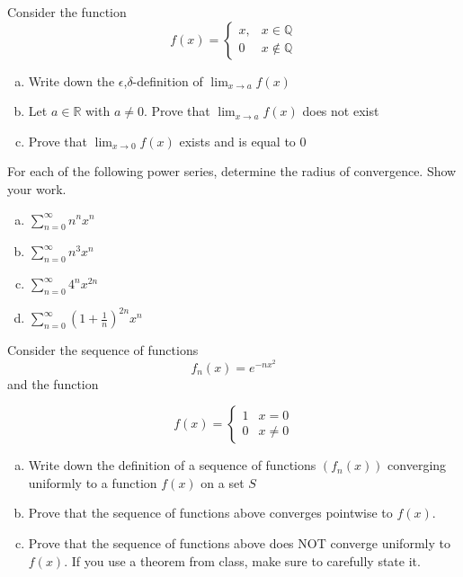 \documentclass[11pt]{exam}
\theoremstyle{definition}
\begin{document}
\begin{questions}
\newpage
\question[10]\mbox{}

Consider the function
$$f(x) = \left\lbrace\begin{array}{cc}x, & x\in \mathbb{Q}\\0 & x\notin\mathbb{Q}\end{array}\right.$$

\begin{enumerate}[(a)]
\item Write down the $\epsilon$,$\delta$-definition of $\lim_{x\rightarrow a} f(x)$
\vspace{1in}
\item Let $a\in\mathbb{R}$ with $a\neq 0$.  Prove that $\lim_{x\rightarrow a}f(x)$ does not exist
\vspace{3in}
\item Prove that $\lim_{x\rightarrow 0} f(x)$ exists and is equal to $0$
\end{enumerate}

\newpage
\question[10]\mbox{}

For each of the following power series, determine the radius of convergence.  Show your work.

\begin{enumerate}[(a)]
\item $\sum_{n=0}^\infty n^nx^n$
\vspace{2in}
\item $\sum_{n=0}^\infty n^3x^n$
\vspace{2in}
\item $\sum_{n=0}^\infty 4^nx^{2n}$
\vspace{2in}
\item $\sum_{n=0}^\infty \left(1+\frac{1}{n}\right)^{2n}x^n$
\end{enumerate}

\newpage
\question[10]\mbox{}
Consider the sequence of functions $$f_n(x) = e^{-nx^2}$$ and the function

$$f(x) = \left\lbrace\begin{array}{cc}1 & x=0\\0 & x\neq 0\end{array}\right.$$

\begin{enumerate}[(a)]
\item Write down the definition of a sequence of functions $(f_n(x))$ converging uniformly to a function $f(x)$ on a set $S$
\vspace{1.5in}
\item Prove that the sequence of functions above converges pointwise to $f(x)$.
\vspace{3in}
\item Prove that the sequence of functions above does NOT converge uniformly to $f(x)$.  If you use a theorem from class, make sure to carefully state it.
\end{enumerate}



\end{questions}
\end{document}
